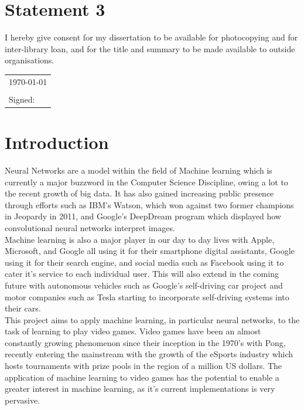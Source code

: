 \documentclass[10pt]{article}
\begin{document}
\section*{Statement 3}

I hereby give consent for my dissertation to be available for
photocopying and for inter-library loan, and for the title and summary
to be made available to outside organisations.

\vspace{0.5cm}
\begin{tabular}{l}
\today\\
\\
Signed:
\end{tabular}

\newpage
\tableofcontents
\newpage

\section{Introduction}
	Neural Networks are a model within the field of Machine learning which is currently a major buzzword in the Computer Science Discipline, owing a lot to the recent growth of big data. It has also gained increasing public presence through efforts such as IBM's Watson, which won against two former champions in Jeopardy in 2011, and Google's DeepDream program which displayed how convolutional neural networks interpret images.\\
	Machine learning is also a major player in our day to day lives with Apple, Microsoft, and Google all using it for their smartphone digital assistants, Google using it for their search engine, and social media such as Facebook using it to cater it's service to each individual user. This will also extend in the coming future with autonomous vehicles such as Google's self-driving car project and motor companies such as Tesla starting to incorporate self-driving systems into their cars.\\
	
	This project aims to apply machine learning, in particular neural networks, to the task of learning to play video games. Video games have been an almost constantly growing phenomenon since their inception in the 1970's with Pong, recently entering the mainstream with the growth of the eSports industry which hosts tournaments with prize pools in the region of a million US dollars. The application of machine learning to video games has the potential to enable a greater interest in machine learning, as it's current implementations is very pervasive.\\
	
\end{document}
